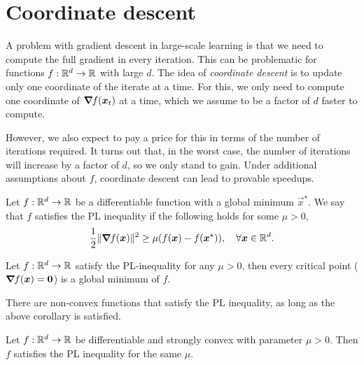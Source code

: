 \section{Coordinate descent}

A problem with gradient descent in large-scale learning is that we need to compute the full
gradient in every iteration. This can be problematic for functions $f: \mathbb{R}^d \to \mathbb{R}$ with large $d$.
The idea of \textit{coordinate descent} is to update only one coordinate of the iterate at a time.
For this, we only need to compute one coordinate of $\bm{\nabla}_{\! } f(\bm{x}_t)$ at a time, which we
assume to be a factor of $d$ faster to compute.

However, we also expect to pay a price for this in terms of the number of iterations required. It
turns out that, in the worst case, the number of iterations will increase by a factor of $d$, so we
only stand to gain. Under additional assumptions about $f$, coordinate descent can lead to provable
speedups.

\begin{definition}
    Let $f: \mathbb{R}^d \to \mathbb{R}$ be a differentiable function with a global minimum $\vec{x}^\star$. We say
    that $f$ satisfies the PL inequality if the following holds for some $\mu > 0$, \[
        \frac{1}{2} \| \bm{\nabla}_{\! } f(\bm{x}) \|^2 \geq \mu (f(\bm{x}) - f(\bm{x}^\star)), \quad \forall \bm{x} \in \mathbb{R}^d.
    \]
\end{definition}

\begin{corollary}
    Let $f: \mathbb{R}^d \to \mathbb{R}$ satisfy the PL-inequality for any $\mu > 0$, then every critical point
    ($\bm{\nabla}_{\! } f(\bm{x}) = \bm{0}$) is a global minimum of $f$.
\end{corollary}

There are non-convex functions that satisfy the PL inequality, as long as the above corollary is
satisfied.

\begin{lemma}
    Let $f: \mathbb{R}^d \to \mathbb{R}$ be differentiable and strongly convex with parameter $\mu > 0$. Then $f$
    satisfies the PL inequality for the same $\mu$.
\end{lemma}

